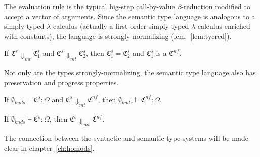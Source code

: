

The evaluation rule is the typical big-step call-by-value $\beta$-reduction modified to accept a vector of arguments. Since the semantic type language is analogous to a simply-typed $\lambda$-calculus (actually a first-order simply-typed $\lambda$-calculus enriched with constants), the language is strongly normalizing (lem.~\ref{lem:tycred}). 

\begin{lemma}
If $\mathfrak{C}^s \Downarrow_{mt} \mathfrak{C}^s_1$ and $\mathfrak{C}^s \Downarrow_{mt} \mathfrak{C}^s_2$, then $\mathfrak{C}^s_1 = \mathfrak{C}^s_2$ and $\mathfrak{C}^s_1$ is a $\mathfrak{C}^{nf}$. 
\end{lemma}

Not only are the types strongly-normalizing, the semantic type language also has preservation and progress properties. 

\begin{lemma}
If $\emptyset_{knds}\vdash\mathfrak{C}^s:\Omega$ and $\mathfrak{C}^s \Downarrow_{mt} \mathfrak{C}^{nf}$, then $\emptyset_{knds}\vdash\mathfrak{C}^{nf} : \Omega$. 
\end{lemma}
 
\begin{lemma}[Progress]
If $\emptyset_{knds}\vdash\mathfrak{C}^s:\Omega$, then $\mathfrak{C}^s \Downarrow_{mt} \mathfrak{C}^{nf}$. 
\end{lemma}

The connection between the syntactic and semantic type systems will be made clear in chapter~\ref{ch:homods}.  

